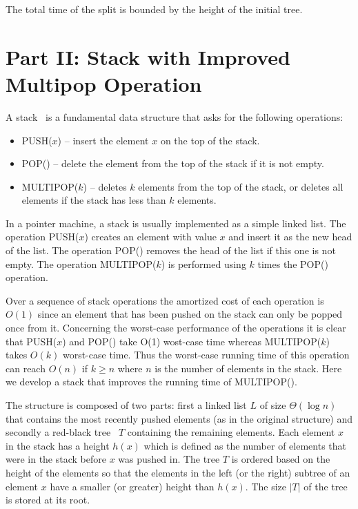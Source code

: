 \documentclass[letterpaper,11pt]{article}
\begin{document}
The total time of the split is bounded by the height of the initial tree.







\section*{Part II: Stack with Improved Multipop Operation}
\label{stack}
A stack~\cite{Cormen2001} is a fundamental data structure that asks for the following operations:
\begin{itemize}
\item {P{\scriptsize USH}($x$)} -- insert the element $x$ on the top of the stack.
\item {P{\scriptsize OP}()} -- delete the element from the top of the stack if it is not empty.
\item {M{\scriptsize ULTIPOP}($k$)} -- deletes $k$ elements from the top of the stack, or deletes all elements if the stack has less than $k$ elements.
\end{itemize}
In a pointer machine, a stack is usually implemented as a simple linked list. The operation {P{\scriptsize USH}($x$)} creates an element with value $x$ and insert it as the new head of the list. The operation {P{\scriptsize OP}()} removes the head of the list if this one is not empty. The operation {M{\scriptsize ULTIPOP}($k$)} is performed using $k$ times the {P{\scriptsize OP}()} operation.

Over a sequence of stack operations the amortized cost of each operation is $O(1)$ since an element that has been pushed on the stack can only be popped once from it. Concerning the worst-case performance of the operations it is clear that {P{\scriptsize USH}($x$)} and {P{\scriptsize OP}()} take O(1) wost-case time whereas {M{\scriptsize ULTIPOP}($k$)} takes $O(k)$ worst-case time. Thus the worst-case running time of this operation can reach $O(n)$ if $k\geq n$ where $n$ is the number of elements in the stack. Here we develop a stack that improves the running time of {M{\scriptsize ULTIPOP}()}. 

The structure is composed of two parts: first a linked list $L$ of size $\Theta( \log n)$ that contains the most recently pushed elements (as in the original structure) and secondly a red-black tree~\cite{redblack} $T$ containing the remaining elements. Each element $x$ in the stack has a height $h(x)$ which is defined as the number of elements that were in the stack before $x$ was pushed in. The tree $T$ is ordered based on the height of the elements so that the elements in the left (or the right) subtree of an element $x$ have a smaller (or greater) height than $h(x)$. The size $|T|$ of the tree is stored at its root.
\end{document}
